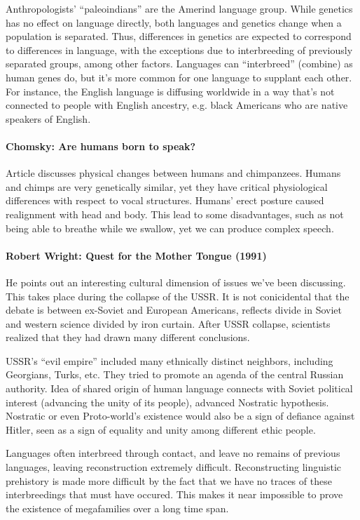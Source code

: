 \documentclass{exam}
\begin{document}
Anthropologists' ``paleoindians'' are the Amerind language group.
While genetics has no effect on language directly, both languages and genetics change when a population is separated.
Thus, differences in genetics are expected to correspond to differences in language, with the exceptions due to interbreeding of previously separated groups, among other factors. 
Languages can ``interbreed'' (combine) as human genes do, but it's more common for one language to supplant each other.
For instance, the English language is diffusing worldwide in a way that's not connected to people with English ancestry, e.g. black Americans who are native speakers of English. 

\paragraph{Chomsky: Are humans born to speak?}

Article discusses physical changes between humans and chimpanzees. 
Humans and chimps are very genetically similar, yet they have critical physiological differences with respect to vocal structures. 
Humans' erect posture caused realignment with head and body.
This lead to some disadvantages, such as not being able to breathe while we swallow, yet we can produce complex speech. 


\paragraph{Robert Wright: Quest for the Mother Tongue (1991)}
He points out an interesting cultural dimension of issues we've been discussing. 
This takes place during the collapse of the USSR. 
It is not conicidental that the debate is between ex-Soviet and European Americans, reflects divide in Soviet and western science divided by iron curtain. 
After USSR collapse, scientists realized that they had drawn many different conclusions. 

USSR's ``evil empire'' included many ethnically distinct neighbors, including Georgians, Turks, etc.
They tried to promote an agenda of the central Russian authority. 
Idea of shared origin of human language connects with Soviet political interest (advancing the unity of its people), advanced Nostratic hypothesis. 
Nostratic or even Proto-world's existence would also be a sign of defiance against Hitler, seen as a sign of equality and unity among different ethic people. 

Languages often interbreed through contact, and leave no remains of previous languages, leaving reconstruction extremely difficult.
Reconstructing linguistic prehistory is made more difficult by the fact that we have no traces of these interbreedings that must have occured.
This makes it near impossible to prove the existence of megafamilies over a long time span. 
\end{document}
